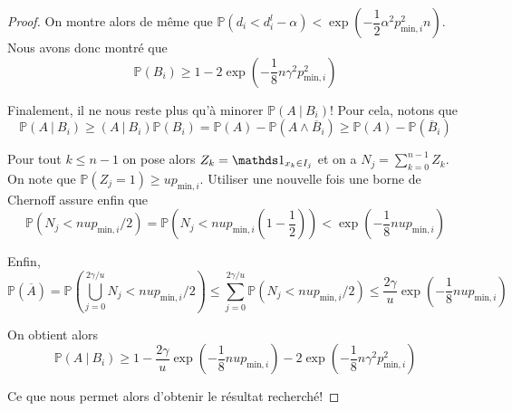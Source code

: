 \begin{proof}
    On montre alors de même que \(\mathbb P\left( d_i < d_i^l - \alpha \right) < \exp\left( -\dfrac{1}{2}\alpha^2 p_{\text{min}, i}^2n\right)\). Nous avons donc montré que 
    \[
        \mathbb P \left( B_i \right) \geq 1 - 2\exp\left( -\dfrac{1}{8}n\gamma^2 p_{\text{min}, i}^2\right)
    \]

    Finalement, il ne nous reste plus qu'à minorer \(\mathbb P (A\ | \ B_i)\)! Pour cela, notons que 
    \[
        \mathbb P (A\ | \ B_i) \geq (A\ | \ B_i)\mathbb P(B_i) = \mathbb P (A) - \mathbb P \left( A \wedge \overline B_i \right) \geq \mathbb P (A) - \mathbb P (\overline B_i)
    \]

    Pour tout \(k \leq n - 1\) on pose alors \(Z_k = \un_{x_k \in I_j}\) et on a \(N_j = \sum_{k = 0}^{n-1} Z_k\). On note que \(\mathbb P (Z_j = 1) \geq u p_{\text{min}, i}\). Utiliser une nouvelle fois une borne de {\sc Chernoff} \cite{10.5555/3134214} assure enfin que 
    \[
        \mathbb P \left( N_j < n u p_{\text{min}, i}/2\right) = \mathbb P \left( N_j < n u p_{\text{min}, i} \left( 1 - \dfrac{1}{2} \right)\right) < \exp\left( - \dfrac{1}{8}n u p_{\text{min}, i} \right)
    \]

    Enfin,
    \[
    \mathbb P \left( \overline A \right)  = \mathbb P \left( \bigcup_{j = 0}^{2\gamma /u} N_j < n u p_{\text{min}, i}/2  \right) \leq \sum_{j = 0}^{2\gamma/u} \mathbb P \left( N_j < n u p_{\text{min}, i}/2 \right) \leq \dfrac{2\gamma}{u}\exp\left( - \dfrac{1}{8}n u p_{\text{min}, i} \right)
    \]


    On obtient alors 
    \[
        \mathbb P (A\ | \ B_i) \geq 1 - \dfrac{2\gamma}{u}\exp\left( - \dfrac{1}{8}n u p_{\text{min}, i} \right) - 2\exp\left( -\dfrac{1}{8}n\gamma^2 p_{\text{min}, i}^2\right) 
    \]

    Ce que nous permet alors d'obtenir le résultat recherché!
\end{proof}


 